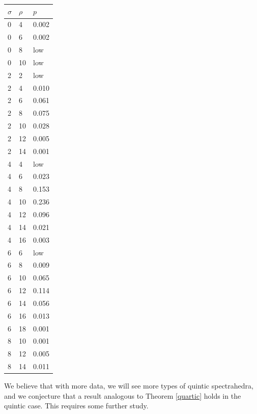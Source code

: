 \documentclass[12pt]{amsart}
\theoremstyle{plain}
\theoremstyle{definition}
\begin{document}
\begin{center}
\begin{tabular}{| l | l | l |} 
	$\sigma$ & $\rho$ & $p$ \\ \hline
	0 & 4 & 0.002    \\
	0 & 6 & 0.002    \\
	0 & 8 & low    \\
	0 & 10 & low    \\
	2 & 2 & low    \\
	2 & 4 & 0.010    \\
	2 & 6 & 0.061    \\
	2 & 8 & 0.075    \\
	2 & 10 & 0.028    \\
	2 & 12 & 0.005    \\
	2 & 14 & 0.001    \\
	4 & 4 & low    \\
	4 & 6 & 0.023    \\
	4 & 8 & 0.153    \\
	4 & 10 & 0.236    \\
	4 & 12 & 0.096    \\
	4 & 14 & 0.021    \\
	4 & 16 & 0.003    \\
	6 & 6 & low    \\
	6 & 8 & 0.009    \\
	6 & 10 & 0.065    \\
	6 & 12 & 0.114    \\
	6 & 14 & 0.056    \\
	6 & 16 & 0.013    \\
	6 & 18 & 0.001    \\
	8 & 10 & 0.001    \\
	8 & 12 & 0.005    \\
	8 & 14 & 0.011    \\ \hline
\end{tabular} 
\end{center}

We believe that with more data, we will see more types of quintic spectrahedra,
and we conjecture that a result analogous to Theorem \ref{quartic} holds in the
quintic case. This requires some further study.




\nocite{*}
\end{document}
